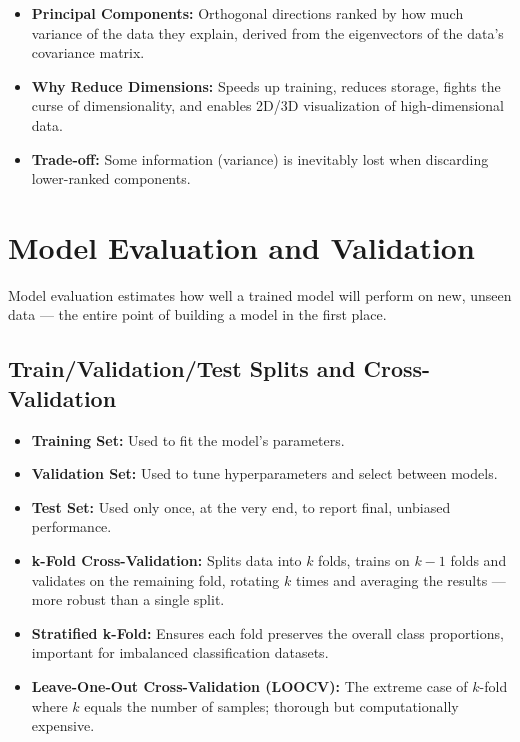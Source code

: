 \documentclass[11pt,a4paper]{article}
\begin{document}
\begin{itemize}[leftmargin=*]
  \item \textbf{Principal Components:} Orthogonal directions ranked by how much variance of the data they explain, derived from the eigenvectors of the data's covariance matrix.
  \item \textbf{Why Reduce Dimensions:} Speeds up training, reduces storage, fights the curse of dimensionality, and enables 2D/3D visualization of high-dimensional data.
  \item \textbf{Trade-off:} Some information (variance) is inevitably lost when discarding lower-ranked components.
\end{itemize}

\section{Model Evaluation and Validation}

\begin{definitionbox}
Model evaluation estimates how well a trained model will perform on new, unseen data --- the entire point of building a model in the first place.
\end{definitionbox}

\subsection{Train/Validation/Test Splits and Cross-Validation}
\begin{itemize}[leftmargin=*]
  \item \textbf{Training Set:} Used to fit the model's parameters.
  \item \textbf{Validation Set:} Used to tune hyperparameters and select between models.
  \item \textbf{Test Set:} Used only once, at the very end, to report final, unbiased performance.
  \item \textbf{k-Fold Cross-Validation:} Splits data into $k$ folds, trains on $k-1$ folds and validates on the remaining fold, rotating $k$ times and averaging the results --- more robust than a single split.
  \item \textbf{Stratified k-Fold:} Ensures each fold preserves the overall class proportions, important for imbalanced classification datasets.
  \item \textbf{Leave-One-Out Cross-Validation (LOOCV):} The extreme case of $k$-fold where $k$ equals the number of samples; thorough but computationally expensive.
\end{itemize}
\end{document}
